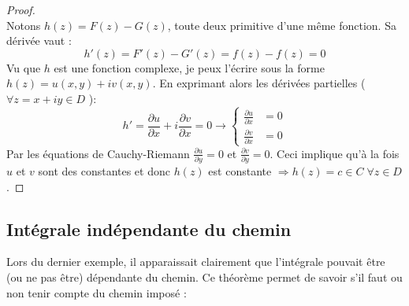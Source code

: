     \begin{proof}\ \\
    Notons $h(z) = F(z) - G(z)$, toute deux primitive d'une même fonction. Sa dérivée
    vaut :
    \begin{equation}
    h'(z) =  F'(z) - G'(z) = f(z) - f(z) = 0
    \end{equation}
    Vu que $h$ est une fonction complexe, je peux l'écrire sous la forme $h(z) = 
    u(x,y) + iv(x,y)$. En exprimant alors les dérivées partielles ($\forall z =
    x + iy \in D$ ):
    \begin{equation}
    h' = \frac{\partial u}{\partial x} + i\frac{\partial v}{\partial x} = 0 \rightarrow
    \left\{\begin{array}{ll}
    \frac{\partial u}{\partial x} &= 0  \\
    \frac{\partial v}{\partial x} &= 0 
    \end{array}\right.
    \end{equation}
    Par les équations de Cauchy-Riemann $\frac{\partial u}{\partial y} =0$ et 
    $\frac{\partial v}{\partial y} = 0$. Ceci implique qu'à la fois $u$ et $v$ sont
    des constantes et donc $h(z)$ est constante $\Rightarrow h(z) = c \in C \; \forall
    z \in D$.
    \end{proof}
    
    \subsection{Intégrale indépendante du chemin}
    Lors du dernier exemple, il apparaissait clairement que l'intégrale pouvait être
    (ou ne pas être) dépendante du chemin. Ce théorème permet de savoir s'il faut ou
    non tenir compte du chemin imposé :\\
    
    
